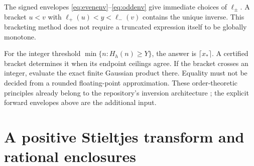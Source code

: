 \documentclass[11pt,a4paper]{article}
\numberwithin{equation}{section}
\theoremstyle{plain}
\theoremstyle{definition}
\theoremstyle{remark}
\begin{document}
The signed envelopes \eqref{eq:evenenv}--\eqref{eq:oddenv} give immediate
choices of $\ell_\pm$. A bracket $u<v$ with $\ell_+(u)<y<\ell_-(v)$ contains
the unique inverse. This bracketing method does not require a truncated
expression itself to be globally monotone.

For the integer threshold $\min\{n:H_h(n)\ge Y\}$, the answer is
$\lceil x_*\rceil$. A certified bracket determines it when its endpoint
ceilings agree. If the bracket crosses an integer, evaluate the exact finite
Gaussian product there. Equality must not be decided from a rounded
floating-point approximation. These order-theoretic principles already
belong to the repository's inversion architecture \cite{repo}; the explicit
forward envelopes above are the additional input.

\section{A positive Stieltjes transform and rational enclosures}
\label{sec:stieltjes}
\end{document}
